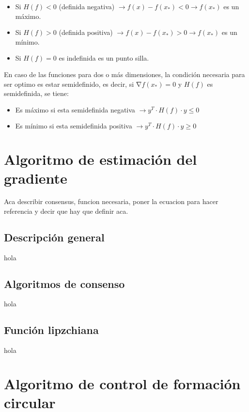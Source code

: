\begin{itemize}
	\item Si ${H}\left(f\right)<0$ (definida negativa) $\rightarrow{f}\left(x\right)-f\left(x_{*}\right)<0\rightarrow{f}\left(x_{*}\right)$ es un máximo.
	\item Si ${H}\left(f\right)>0$ (definida positiva) $\rightarrow{f}\left(x\right)-f\left(x_{*}\right)>0\rightarrow{f}\left(x_{*}\right)$ es un mínimo.
	\item Si ${H}\left(f\right)=0$ es indefinida es un punto silla.
\end{itemize}

En caso de las funciones para dos o más dimensiones, la condición necesaria para ser optimo es estar semidefinido, es decir, si $\mathrm{\nabla}{f}{\left(x_{*}\right)}=0$ y ${H}\left(f\right)$ es semidefinida, se tiene:

\begin{itemize}
	\item Es máximo si esta semidefinida negativa $\rightarrow{y}^{T}\cdot{H}\left({f}\right)\cdot{y}\leq{0}$
	\item Es mínimo si esta semidefinida positiva $\rightarrow{y}^{T}\cdot{H}\left({f}\right)\cdot{y}\geq{0}$
\end{itemize}

\section{Algoritmo de estimación del gradiente}

Aca describir consensus, funcion necesaria, poner la ecuacion para hacer referencia y decir que hay que definir aca.

\subsection{Descripción general}

hola

\subsection{Algoritmos de consenso}

hola

\subsection{Función lipzchiana}

hola


\section{Algoritmo de control de formación circular}

